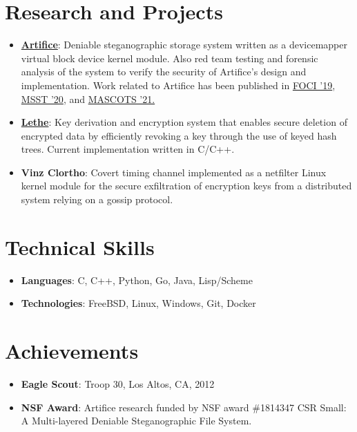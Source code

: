 \documentclass[letterpaper,10pt,oneside]{memoir}
\newcommand{\resumeItem}[2]{
  \item\small{
    \textbf{#1}{: #2}
  }
}
\newcommand{\resumeSubItem}[2]{\resumeItem{#1}{#2}}
\newcommand{\resumeSubHeadingListStart}{\vspace{1pt}\begin{itemize}[noitemsep,nolistsep,leftmargin=*,label={}]}
\newcommand{\resumeSubHeadingListEnd}{\end{itemize}}
\begin{document}
\section{Research and Projects}
  \resumeSubHeadingListStart
    \resumeSubItem{\href{https://www.ssrc.ucsc.edu/proj/Artifice.html}{Artifice}}
      {Deniable steganographic storage system written as a devicemapper virtual block device kernel module. Also red team testing and forensic 
      analysis of the system to verify the security of Artifice's design and implementation. Work related to Artifice has been published in 
      \href{https://www.usenix.org/system/files/foci19-paper_barker.pdf}{FOCI '19}, \href{https://storageconference.us/2020/Papers/03.Artifice.pdf}{MSST '20}, and \href{https://www.ssrc.ucsc.edu/media/pubs/b5d2cdef04702983d608a8f3ca2994db1fc22f2d.pdf}{MASCOTS '21.}}
    \resumeSubItem{\href{https://www.ssrc.ucsc.edu/proj/securefs.html}{Lethe}}
      {Key derivation and encryption system that enables secure deletion of encrypted data by efficiently revoking a key through the use of keyed hash trees. Current implementation written in C/C++.}
    \resumeSubItem{Vinz Clortho}
      {Covert timing channel implemented as a netfilter Linux kernel module for the secure exfiltration of encryption keys from a distributed system relying on a gossip protocol.}
  \resumeSubHeadingListEnd

\section{Technical Skills}
  \resumeSubHeadingListStart
    \resumeSubItem{Languages}
      {C, C++, Python, Go, Java, Lisp/Scheme}
   \resumeSubItem{Technologies}
      {FreeBSD, Linux, Windows, Git, Docker}
  \resumeSubHeadingListEnd

\section{Achievements}
  \resumeSubHeadingListStart
  \resumeSubItem{Eagle Scout}
     {Troop 30, Los Altos, CA, 2012}
  \resumeSubItem{NSF Award}{Artifice research funded by NSF award \#1814347 CSR Small: A Multi-layered Deniable Steganographic File System.}
  \resumeSubHeadingListEnd

\end{document}
